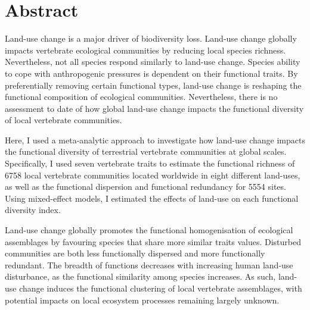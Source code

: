 \section*{Abstract} Land-use change is a major driver of biodiversity loss. Land-use change globally impacts vertebrate ecological communities by reducing local species richness. Nevertheless, not all species respond similarly to land-use change. Species ability to cope with anthropogenic pressures is dependent on their functional traits. By preferentially removing certain functional types, land-use change is reshaping the functional composition of ecological communities. Nevertheless, there is no assessment to date of how global land-use change impacts the functional diversity of local vertebrate communities. 

Here, I used a meta-analytic approach to investigate how land-use change impacts the functional diversity of terrestrial vertebrate communities at global scales. Specifically, I used seven vertebrate traits to estimate the functional richness of 6758 local vertebrate communities located worldwide in eight different land-uses, as well as the functional dispersion and functional redundancy for 5554 sites. Using mixed-effect models, I estimated the effects of land-use on each functional diversity index.  

Land-use change globally promotes the functional homogenisation of ecological assemblages by favouring species that share more similar traits values. Disturbed communities are both less functionally dispersed and more functionally redundant. The breadth of functions decreases with increasing human land-use disturbance, as the functional similarity among species increases. As such, land-use change induces the functional clustering of local vertebrate assemblages, with  potential impacts on local ecosystem processes remaining largely unknown.

\pagebreak



